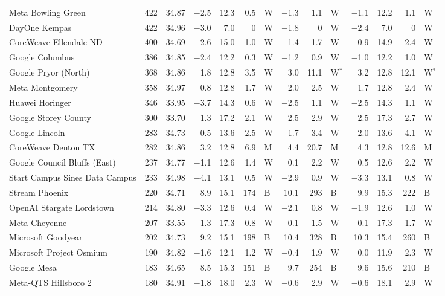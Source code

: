 {\begin{longtable}{@{}lrrrrrlrrlrrrl@{}}
Meta Bowling Green & 422 & 34.87 & $-$2.5 & 12.3 & 0.5 & W & $-$1.3 & 1.1 & W & $-$1.1 & 12.2 & 1.1 & W \\
DayOne Kempas & 422 & 34.96 & $-$3.0 & 7.0 & 0 & W & $-$1.8 & 0 & W & $-$2.4 & 7.0 & 0 & W \\
CoreWeave Ellendale ND & 400 & 34.69 & $-$2.6 & 15.0 & 1.0 & W & $-$1.4 & 1.7 & W & $-$0.9 & 14.9 & 2.4 & W \\
Google Columbus & 386 & 34.85 & $-$2.4 & 12.2 & 0.3 & W & $-$1.2 & 0.9 & W & $-$1.0 & 12.2 & 1.0 & W \\
Google Pryor (North) & 368 & 34.86 & 1.8 & 12.8 & 3.5 & W & 3.0 & 11.1 & W$^{\ast}$ & 3.2 & 12.8 & 12.1 & W$^{\ast}$ \\
Meta Montgomery & 358 & 34.97 & 0.8 & 12.8 & 1.7 & W & 2.0 & 2.5 & W & 1.7 & 12.8 & 2.4 & W \\
Huawei Horinger & 346 & 33.95 & $-$3.7 & 14.3 & 0.6 & W & $-$2.5 & 1.1 & W & $-$2.5 & 14.3 & 1.1 & W \\
Google Storey County & 300 & 33.70 & 1.3 & 17.2 & 2.1 & W & 2.5 & 2.9 & W & 2.5 & 17.3 & 2.7 & W \\
Google Lincoln & 283 & 34.73 & 0.5 & 13.6 & 2.5 & W & 1.7 & 3.4 & W & 2.0 & 13.6 & 4.1 & W \\
CoreWeave Denton TX & 282 & 34.86 & 3.2 & 12.8 & 6.9 & M & 4.4 & 20.7 & M & 4.3 & 12.8 & 12.6 & M \\
Google Council Bluffs (East) & 237 & 34.77 & $-$1.1 & 12.6 & 1.4 & W & 0.1 & 2.2 & W & 0.5 & 12.6 & 2.2 & W \\
Start Campus Sines Data Campus & 233 & 34.98 & $-$4.1 & 13.1 & 0.5 & W & $-$2.9 & 0.9 & W & $-$3.3 & 13.1 & 0.8 & W \\
Stream Phoenix & 220 & 34.71 & 8.9 & 15.1 & 174 & B & 10.1 & 293 & B & 9.9 & 15.3 & 222 & B \\
OpenAI Stargate Lordstown & 214 & 34.80 & $-$3.3 & 12.6 & 0.4 & W & $-$2.1 & 0.8 & W & $-$1.9 & 12.6 & 1.0 & W \\
Meta Cheyenne & 207 & 33.55 & $-$1.3 & 17.3 & 0.8 & W & $-$0.1 & 1.5 & W & 0.1 & 17.3 & 1.7 & W \\
Microsoft Goodyear & 202 & 34.73 & 9.2 & 15.1 & 198 & B & 10.4 & 328 & B & 10.3 & 15.4 & 260 & B \\
Microsoft Project Osmium & 190 & 34.82 & $-$1.6 & 12.1 & 1.2 & W & $-$0.4 & 1.9 & W & 0.0 & 11.9 & 2.3 & W \\
Google Mesa & 183 & 34.65 & 8.5 & 15.3 & 151 & B & 9.7 & 254 & B & 9.6 & 15.6 & 210 & B \\
Meta-QTS Hillsboro 2 & 180 & 34.91 & $-$1.8 & 18.0 & 2.3 & W & $-$0.6 & 2.9 & W & $-$0.6 & 18.1 & 2.9 & W \\

\end{longtable}}
